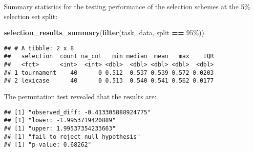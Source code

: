 \documentclass[
]{book}
\newenvironment{Shaded}{\begin{snugshade}}{\end{snugshade}}
\newcommand{\AttributeTok}[1]{\textcolor[rgb]{0.13,0.29,0.53}{#1}}
\newcommand{\DecValTok}[1]{\textcolor[rgb]{0.00,0.00,0.81}{#1}}
\newcommand{\FunctionTok}[1]{\textcolor[rgb]{0.13,0.29,0.53}{\textbf{#1}}}
\newcommand{\NormalTok}[1]{#1}
\newcommand{\OtherTok}[1]{\textcolor[rgb]{0.56,0.35,0.01}{#1}}
\newcommand{\SpecialCharTok}[1]{\textcolor[rgb]{0.81,0.36,0.00}{\textbf{#1}}}
\newcommand{\StringTok}[1]{\textcolor[rgb]{0.31,0.60,0.02}{#1}}
\begin{document}
Summary statistics for the testing performance of the selection schemes at the 5\% selection set split:

\begin{Shaded}
\begin{Highlighting}[]
\FunctionTok{selection\_results\_summary}\NormalTok{(}\FunctionTok{filter}\NormalTok{(task\_data, split }\SpecialCharTok{==} \StringTok{\textquotesingle{}95\%\textquotesingle{}}\NormalTok{))}
\end{Highlighting}
\end{Shaded}

\begin{verbatim}
## # A tibble: 2 x 8
##   selection  count na_cnt   min median  mean   max    IQR
##   <fct>      <int>  <int> <dbl>  <dbl> <dbl> <dbl>  <dbl>
## 1 tournament    40      0 0.512  0.537 0.539 0.572 0.0203
## 2 lexicase      40      0 0.513  0.540 0.541 0.562 0.0177
\end{verbatim}

The permutation test revealed that the results are:

\begin{Shaded}
\end{Shaded}

\begin{verbatim}
## [1] "observed_diff: -0.413305888924775"
## [1] "lower: -1.9953719420889"
## [1] "upper: 1.99537354233663"
## [1] "fail to reject null hypothesis"
## [1] "p-value: 0.68262"
\end{verbatim}
\end{document}

